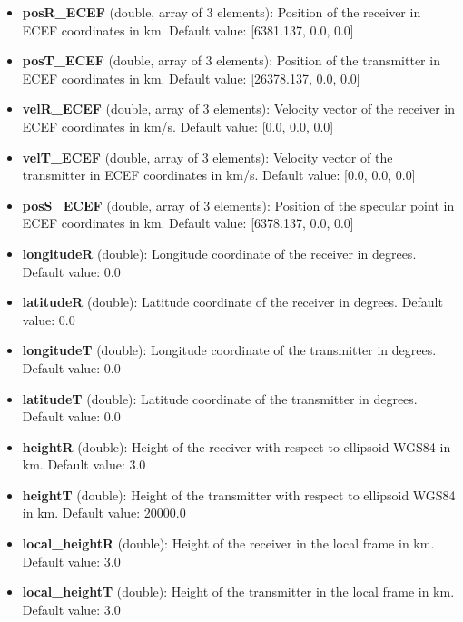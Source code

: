 \begin{itemize}
\item {\bf posR\_ECEF} (double, array of 3 elements): Position of the receiver in ECEF coordinates in km. Default value: [6381.137, 0.0, 0.0]

\item {\bf posT\_ECEF} (double, array of 3 elements): Position of the transmitter in ECEF coordinates in km. Default value: [26378.137, 0.0, 0.0]

\item {\bf velR\_ECEF} (double, array of 3 elements): Velocity vector of the receiver in ECEF coordinates in km/s. Default value: [0.0, 0.0, 0.0]

\item {\bf velT\_ECEF} (double, array of 3 elements): Velocity vector of the transmitter in ECEF coordinates in km/s. Default value: [0.0, 0.0, 0.0]

\item {\bf posS\_ECEF} (double, array of 3 elements): Position of the specular point in ECEF coordinates in km. Default value: [6378.137, 0.0, 0.0]

\item {\bf longitudeR} (double): Longitude coordinate of the receiver in degrees. Default value: 0.0

\item {\bf latitudeR} (double): Latitude coordinate of the receiver in degrees. Default value: 0.0

\item {\bf longitudeT} (double): Longitude coordinate of the transmitter in degrees. Default value: 0.0

\item {\bf latitudeT} (double): Latitude coordinate of the transmitter in degrees. Default value: 0.0

\item {\bf heightR} (double): Height of the receiver with respect to ellipsoid WGS84 in km. Default value: 3.0

\item {\bf heightT} (double): Height of the transmitter with respect to ellipsoid WGS84 in km. Default value: 20000.0

\item {\bf local\_heightR} (double): Height of the receiver in the local frame in km. Default value: 3.0

\item {\bf local\_heightT} (double): Height of the transmitter in the local frame in km. Default value: 3.0


\end{itemize}
